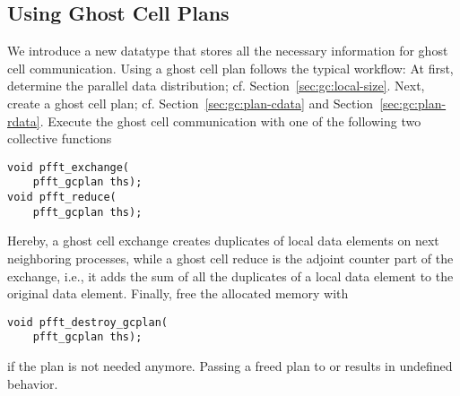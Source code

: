 \subsection{Using Ghost Cell Plans}
We introduce a new datatype  that stores all the necessary information for ghost cell communication.
Using a ghost cell plan follows the typical workflow: At first, determine the parallel data distribution; cf. Section~\ref{sec:gc:local-size}.
Next, create a ghost cell plan; cf. Section~\ref{sec:gc:plan-cdata} and Section~\ref{sec:gc:plan-rdata}. 
Execute the ghost cell communication with one of the following two collective functions
\begin{lstlisting}
void pfft_exchange(
    pfft_gcplan ths);
void pfft_reduce(
    pfft_gcplan ths);
\end{lstlisting}
Hereby, a ghost cell exchange creates duplicates of local data elements on next neighboring processes,  
while a ghost cell reduce is the adjoint counter part of the exchange, i.e.,
it adds the sum of all the duplicates of a local data element to the original data element.
Finally, free the allocated memory with
\begin{lstlisting}
void pfft_destroy_gcplan(
    pfft_gcplan ths);
\end{lstlisting}
if the plan is not needed anymore.
Passing a freed plan to  or  results in undefined behavior.

